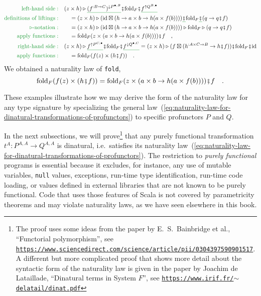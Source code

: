 \begin{align*}
{\color{greenunder}\text{left-hand side}:}\quad & (z\times h)\triangleright\gunderline{(f^{:B\rightarrow C})^{\downarrow P^{\bullet,B}}}\bef\text{fold}_{F}\bef\gunderline{f^{\uparrow Q^{B,\bullet}}}\\
{\color{greenunder}\text{definitions of liftings}:}\quad & \quad=(z\times h)\triangleright(\text{id}\boxtimes(h\rightarrow a\times b\rightarrow h(a\times f(b))))\gunderline{\bef}\text{fold}_{F}\gunderline{\bef}(q\rightarrow q\bef f)\\
{\color{greenunder}\triangleright\text{-notation}:}\quad & \quad=(z\times h)\triangleright(\text{id}\boxtimes(h\rightarrow a\times b\rightarrow h(a\times f(b))))\triangleright\text{fold}_{F}\triangleright(q\rightarrow q\bef f)\\
{\color{greenunder}\text{apply functions}:}\quad & \quad=\text{fold}_{F}(z\times(a\times b\rightarrow h(a\times f(b))))\bef f\quad,\\
{\color{greenunder}\text{right-hand side}:}\quad & (z\times h)\triangleright\gunderline{f^{\uparrow P^{C,\bullet}}}\bef\text{fold}_{F}\bef\gunderline{f^{\downarrow Q^{\bullet,C}}}=(z\times h)\triangleright(f\boxtimes(h^{:A\times C\rightarrow B}\rightarrow h\bef f))\bef\text{fold}_{F}\bef\text{id}\\
{\color{greenunder}\text{apply functions}:}\quad & \quad=\text{fold}_{F}(f(z)\times(h\bef f))\quad.
\end{align*}
We obtained a naturality law of \lstinline!fold!,
\[
\text{fold}_{F}(f(z)\times(h\bef f))=\text{fold}_{F}(z\times(a\times b\rightarrow h(a\times f(b))))\bef f\quad.
\]

These examples illustrate how we may derive the form of the naturality
law for any type signature by specializing the general law~(\ref{eq:naturality-law-for-dinatural-transformations-of-profunctors})
to specific profunctors $P$ and $Q$.

In the next subsections, we will prove\footnote{The proof uses some ideas from the paper by E.~S.~Bainbridge et
al., ``Functorial polymorphism'', see \texttt{\href{https://www.sciencedirect.com/science/article/pii/0304397590901517}{https://www.sciencedirect.com/science/article/pii/0304397590901517}}.
A different but more complicated proof that shows more detail about
the syntactic form of the naturality law is given in the paper by
Joachim de Lataillade, ``Dinatural
terms in System $F$'', see \texttt{\href{https://www.irif.fr/~delatail/dinat.pdf}{https://www.irif.fr/$\sim$delatail/dinat.pdf}}} that any purely functional transformation $t^{A}:P^{A,A}\rightarrow Q^{A,A}$
is dinatural, i.e.~satisfies its naturality law~(\ref{eq:naturality-law-for-dinatural-transformations-of-profunctors}).
The restriction to \emph{purely functional} programs
is essential because it excludes, for instance, any use of mutable
variables, \lstinline!null! values, exceptions, run-time type identification,
run-time code loading, or values defined in external libraries that
are not known to be purely functional. Code that uses those features
of Scala is not covered by parametricity theorems and may violate
naturality laws, as we have seen elsewhere in this book.

